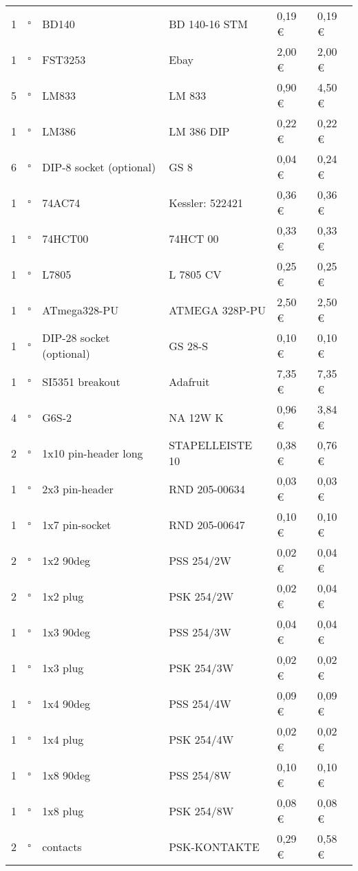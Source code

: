 \documentclass[10pt, a4paper]{scrartcl}
\begin{document}
\begin{longtable}{|p{}|p{}|p{}|p{}|p{}|p{}|}
1 & $\square$ & BD140 & BD 140-16 STM & 0,19 \euro & 0,19 \euro \\
1 & $\square$ & FST3253 & Ebay & 2,00 \euro & 2,00 \euro \\
5 & $\square$ & LM833 & LM 833 & 0,90 \euro & 4,50 \euro \\
1 & $\square$ & LM386 & LM 386 DIP & 0,22 \euro & 0,22 \euro \\
6 & $\square$ & DIP-8 socket (optional) & GS 8 & 0,04 \euro & 0,24 \euro \\
1 & $\square$ & 74AC74 & Kessler: 522421 & 0,36 \euro & 0,36 \euro \\
1 & $\square$ & 74HCT00 & 74HCT 00 & 0,33 \euro & 0,33 \euro \\
1 & $\square$ & L7805 & L 7805 CV & 0,25 \euro & 0,25 \euro \\
1 & $\square$ & ATmega328-PU & ATMEGA 328P-PU & 2,50 \euro & 2,50 \euro \\
1 & $\square$ & DIP-28 socket (optional) & GS 28-S & 0,10 \euro & 0,10 \euro \\
1 & $\square$ & SI5351 breakout & Adafruit & 7,35 \euro & 7,35 \euro \\ \hline
4 & $\square$ & G6S-2 & NA 12W K & 0,96 \euro & 3,84 \euro \\ \hline
2 & $\square$ & 1x10 pin-header long & STAPELLEISTE 10 & 0,38 \euro & 0,76 \euro \\
1 & $\square$ & 2x3 pin-header & RND 205-00634 & 0,03 \euro & 0,03 \euro \\
1 & $\square$ & 1x7 pin-socket & RND 205-00647 & 0,10 \euro & 0,10 \euro \\
2 & $\square$ & 1x2 90deg & PSS 254/2W & 0,02 \euro & 0,04 \euro \\
2 & $\square$ & 1x2 plug & PSK 254/2W & 0,02 \euro & 0,04 \euro \\
1 & $\square$ & 1x3 90deg & PSS 254/3W & 0,04 \euro & 0,04 \euro \\
1 & $\square$ & 1x3 plug & PSK 254/3W & 0,02 \euro & 0,02 \euro \\
1 & $\square$ & 1x4 90deg & PSS 254/4W & 0,09 \euro & 0,09 \euro \\
1 & $\square$ & 1x4 plug & PSK 254/4W & 0,02 \euro & 0,02 \euro \\
1 & $\square$ & 1x8 90deg & PSS 254/8W & 0,10 \euro & 0,10 \euro \\
1 & $\square$ & 1x8 plug & PSK 254/8W & 0,08 \euro & 0,08 \euro \\
2 & $\square$ & contacts & PSK-KONTAKTE & 0,29 \euro & 0,58 \euro \\

\end{longtable}
\end{document}
